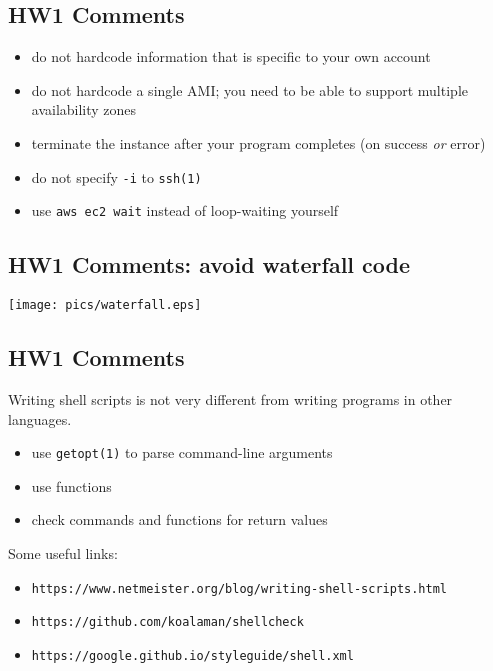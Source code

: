 \documentclass[xga]{xdvislides}
\begin{document}
\subsection{HW1 Comments}
\begin{itemize}
	\item do not hardcode information that is specific to your own account
	\item do not hardcode a single AMI; you need
		to be able to support multiple availability zones
	\item terminate the instance after your
		program completes (on success {\em or} error)
	\item do not specify {\tt -i} to {\tt ssh(1)}
	\item use {\tt aws ec2 wait} instead of loop-waiting yourself
\end{itemize}

\subsection{HW1 Comments: avoid waterfall code}
\begin{center}
	\texttt{[image: pics/waterfall.eps]} \\
\end{center}

\subsection{HW1 Comments}
Writing shell scripts is not very different from
writing programs in other languages.

\begin{itemize}
	\item use \verb+getopt(1)+ to parse command-line arguments
	\item use functions
	\item check commands and functions for return values 
\end{itemize}
\vspace{.5in}

Some useful links:
\begin{itemize}
	\item \verb+https://www.netmeister.org/blog/writing-shell-scripts.html+
	\item \verb+https://github.com/koalaman/shellcheck+
	\item \verb+https://google.github.io/styleguide/shell.xml+
\end{itemize}
\end{document}
